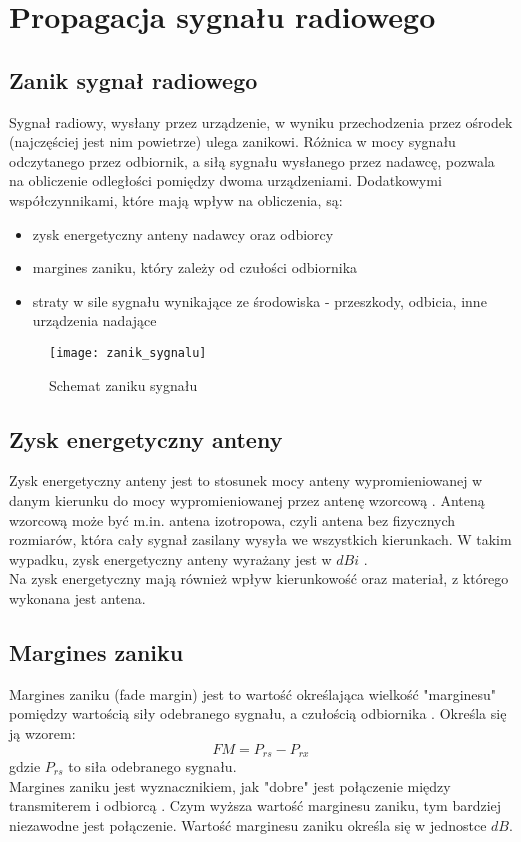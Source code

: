 \chapter{Propagacja sygnału radiowego}
\label{cha:teoria}
\section{Zanik sygnał radiowego}
Sygnał radiowy, wysłany przez urządzenie, w wyniku przechodzenia przez ośrodek (najczęściej jest nim powietrze) ulega zanikowi. \cite{ST} Różnica w mocy sygnału odczytanego przez odbiornik, a siłą sygnału wysłanego przez nadawcę, pozwala na obliczenie odległości pomiędzy dwoma urządzeniami. Dodatkowymi współczynnikami, które mają wpływ na obliczenia, są:
\begin{itemize}
	\item zysk energetyczny anteny nadawcy oraz odbiorcy
	\item margines zaniku, który zależy od czułości odbiornika
	\item straty w sile sygnału wynikające ze środowiska - przeszkody, odbicia, inne urządzenia nadające
\end{itemize}
\begin{figure}[H]			
	\centering
	\caption{Schemat zaniku sygnału}
	\texttt{[image: zanik\_sygnalu]}
\end{figure}
\section{Zysk energetyczny anteny}
Zysk energetyczny anteny jest to stosunek mocy anteny wypromieniowanej w danym kierunku do mocy wypromieniowanej przez antenę wzorcową \cite{ML}. Anteną wzorcową może być m.in. antena izotropowa, czyli antena bez fizycznych rozmiarów, która cały sygnał zasilany wysyła we wszystkich kierunkach. W takim wypadku, zysk energetyczny anteny wyrażany jest w $dBi$ \cite{AG}.\\
Na zysk energetyczny mają również wpływ kierunkowość oraz materiał, z którego wykonana jest antena.
\section{Margines zaniku}
Margines zaniku (fade margin) jest to wartość określająca wielkość "marginesu" pomiędzy wartością siły odebranego sygnału, a czułością odbiornika \cite{RFM}. Określa się ją wzorem:
\begin{equation}
FM = P_{rs} - P_{rx}
\end{equation}
gdzie $P_{rs}$ to siła odebranego sygnału.\\
Margines zaniku jest wyznacznikiem, jak "dobre" jest połączenie między transmiterem i odbiorcą \cite{FMC}. Czym wyższa wartość marginesu zaniku, tym bardziej niezawodne jest połączenie.
Wartość marginesu zaniku określa się w jednostce $dB$.
